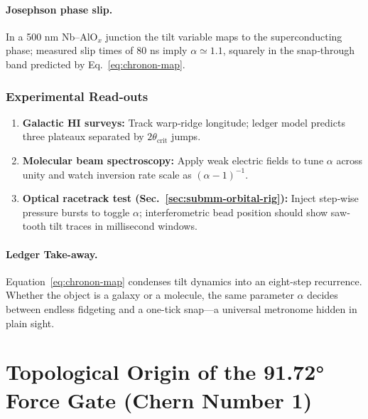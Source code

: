 \documentclass[11pt,oneside]{book}
\begin{document}
\paragraph{Josephson phase slip.}
In a 500 nm Nb–AlO$_x$ junction the tilt variable maps to the
superconducting phase; measured slip times of 80 ns imply
$\alpha\simeq1.1$, squarely in the snap‐through band predicted by
Eq.~\eqref{eq:chronon-map}.

\subsubsection{Experimental Read‐outs}
\label{ss:tilt-observables}

\begin{enumerate}[label=\arabic*.,leftmargin=*,itemsep=3pt]
\item \textbf{Galactic HI surveys:}  
      Track warp‐ridge longitude; ledger model predicts three plateaux
      separated by $2\theta_{\text{crit}}$ jumps.
\item \textbf{Molecular beam spectroscopy:}  
      Apply weak electric fields to tune $\alpha$ across unity and
      watch inversion rate scale as $(\alpha-1)^{-1}$.
\item \textbf{Optical racetrack test (Sec.~\ref{sec:submm-orbital-rig}):}  
      Inject step‐wise pressure bursts to toggle $\alpha$; interferometric
      bead position should show saw‐tooth tilt traces in millisecond
      windows.
\end{enumerate}

\paragraph{Ledger Take-away.}
Equation~\eqref{eq:chronon-map} condenses tilt dynamics into an
eight-step recurrence.  Whether the object is a galaxy or a molecule,
the same parameter $\alpha$ decides between endless fidgeting and a
one-tick snap—a universal metronome hidden in plain sight.

\section{Topological Origin of the 91.72° Force Gate
            (\texorpdfstring{Chern Number 1}{Chern Number 1})}
\label{sec:chern-gate-narrative}
\end{document}
